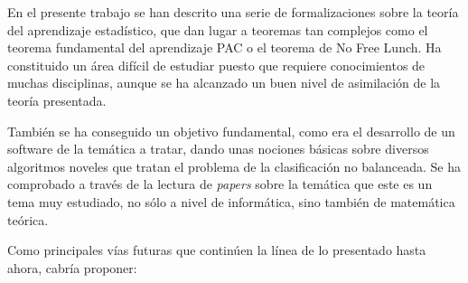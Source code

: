 En el presente trabajo se han descrito una serie de formalizaciones sobre la teoría del aprendizaje estadístico, que dan
lugar a teoremas tan complejos como el teorema fundamental del aprendizaje PAC o el teorema de No Free Lunch. Ha constituido
un área difícil de estudiar puesto que requiere conocimientos de muchas disciplinas, aunque se ha alcanzado un buen nivel de
asimilación de la teoría presentada.

También se ha conseguido un objetivo fundamental, como era el desarrollo de un software de la temática a tratar, 
dando unas nociones básicas sobre diversos algoritmos noveles que tratan el problema de la clasificación no balanceada.
Se ha comprobado a través de la lectura de \textit{papers} sobre la temática que este es un tema muy estudiado, no sólo a
nivel de informática, sino también de matemática teórica.

Como principales vías futuras que continúen la línea de lo presentado hasta ahora, cabría proponer:

